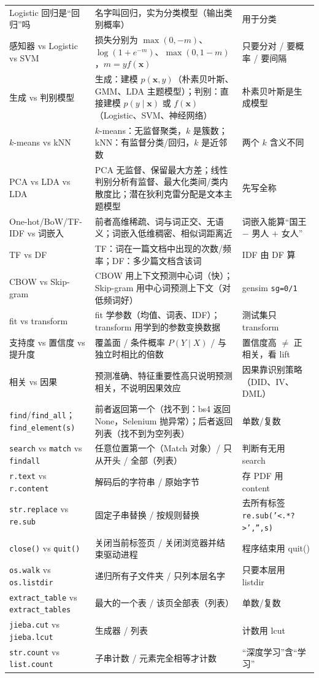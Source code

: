 \begin{longtable}{@{}>{\raggedright\arraybackslash}p{3.2cm}>{\raggedright\arraybackslash}p{\dimexpr\textwidth-6.9cm-10pt\relax}>{\raggedright\arraybackslash}p{3.7cm}@{}}
Logistic 回归是“回归”吗 & 名字叫回归，实为分类模型（输出类别概率） & 用于分类\\
感知器 vs Logistic vs SVM & 损失分别为 $\max(0,-m)$、$\log(1+e^{-m})$、$\max(0,1-m)$，$m=yf(\bm x)$ & 只要分对 / 要概率 / 要间隔\\
生成 vs 判别模型 & 生成：建模 $p(\bm x,y)$（朴素贝叶斯、GMM、LDA 主题模型）；判别：直接建模 $p(y\mid\bm x)$ 或 $f(\bm x)$（Logistic、SVM、神经网络） & 朴素贝叶斯是生成模型\\
$k$-means vs kNN & $k$-means：无监督聚类，$k$ 是簇数；kNN：有监督分类/回归，$k$ 是近邻数 & 两个 $k$ 含义不同\\
PCA vs LDA vs LDA & PCA 无监督、保留最大方差；线性判别分析有监督、最大化类间/类内散度比；潜在狄利克雷分配是文本主题模型 & 先写全称\\
One-hot/BoW/TF-IDF vs 词嵌入 & 前者高维稀疏、词与词正交、无语义；词嵌入低维稠密、相似词距离近 & 词嵌入能算“国王 $-$ 男人 $+$ 女人”\\
TF vs DF & TF：词在一篇文档中出现的次数/频率；DF：多少篇文档含该词 & IDF 由 DF 算\\
CBOW vs Skip-gram & CBOW 用上下文预测中心词（快）；Skip-gram 用中心词预测上下文（对低频词好） & gensim \texttt{sg=0/1}\\
fit vs transform & fit 学参数（均值、词表、IDF）；transform 用学到的参数变换数据 & 测试集只 transform\\
支持度 vs 置信度 vs 提升度 & 覆盖面 / 条件概率 $P(Y\mid X)$ / 与独立时相比的倍数 & 置信度高 $\ne$ 正相关，看 lift\\
相关 vs 因果 & 预测准确、特征重要性高只说明预测相关，不说明因果效应 & 因果靠识别策略（DID、IV、DML）\\
\texttt{find}/\texttt{find\_all}；\texttt{find\_element(s)} & 前者返回第一个（找不到：bs4 返回 None，Selenium 抛异常）；后者返回列表（找不到为空列表） & 单数/复数\\
\texttt{search} vs \texttt{match} vs \texttt{findall} & 任意位置第一个（Match 对象）/ 只从开头 / 全部（列表） & 判断有无用 search\\
\texttt{r.text} vs \texttt{r.content} & 解码后的字符串 / 原始字节 & 存 PDF 用 content\\
\texttt{str.replace} vs \texttt{re.sub} & 固定子串替换 / 按规则替换 & 去所有标签 \texttt{re.sub('<.*?>','',s)}\\
\texttt{close()} vs \texttt{quit()} & 关闭当前标签页 / 关闭浏览器并结束驱动进程 & 程序结束用 quit()\\
\texttt{os.walk} vs \texttt{os.listdir} & 递归所有子文件夹 / 只列本层名字 & 只要本层用 listdir\\
\texttt{extract\_table} vs \texttt{extract\_tables} & 最大的一个表 / 该页全部表（列表） & 单数/复数\\
\texttt{jieba.cut} vs \texttt{jieba.lcut} & 生成器 / 列表 & 计数用 lcut\\
\texttt{str.count} vs \texttt{list.count} & 子串计数 / 元素完全相等才计数 & “深度学习”含“学习”\\
\bottomrule
\end{longtable}\endgroup

